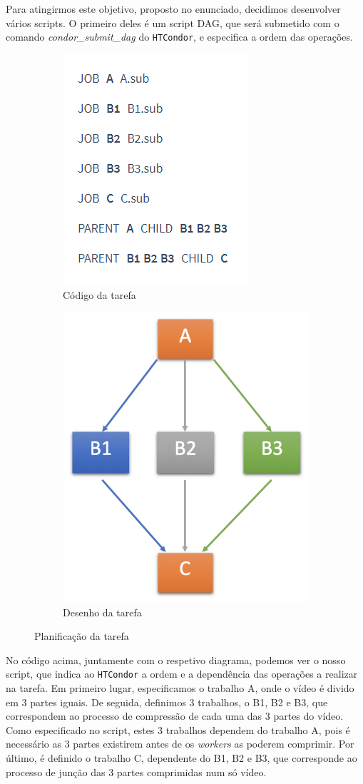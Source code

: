 \documentclass[a4paper]{report}
\begin{document}
    Para atingirmos este objetivo, proposto no enunciado, decidimos desenvolver vários scripts. O primeiro deles é um script DAG, que será submetido com o comando \textit{condor\_submit\_dag} do \texttt{HTCondor}, e especifica a ordem das operações.

	\begin{figure}[H]
		\centering
		\begin{subfigure}{.5\textwidth}
			\centering
			\includegraphics[width=.4\linewidth]{DAG.png}
			\caption{Código da tarefa}
			\label{fig:sub1}
		\end{subfigure}%
		\begin{subfigure}{.5\textwidth}
			\centering
			\includegraphics[width=.4\linewidth]{Arquitetura-HTCondor.png}
			\caption{Desenho da tarefa}
			\label{fig:sub2}
		\end{subfigure}
		\caption{Planificação da tarefa}
		\label{fig:dag}
	\end{figure}

	No código acima, juntamente com o respetivo diagrama, podemos ver o nosso script, que indica ao \texttt{HTCondor} a ordem e a dependência das operações a realizar na tarefa. Em primeiro lugar, especificamos o trabalho A, onde o vídeo é divido em 3 partes iguais. De seguida, definimos 3 trabalhos, o B1, B2 e B3, que correspondem ao processo de compressão de cada uma das 3 partes do vídeo. 
	Como especificado no script, estes 3 trabalhos dependem do trabalho A, pois é necessário as 3 partes existirem antes de os \textit{workers} as poderem comprimir. Por último, é definido o trabalho C, dependente do B1, B2 e B3, que corresponde ao processo de junção das 3 partes comprimidas num só vídeo.
	
\end{document}
